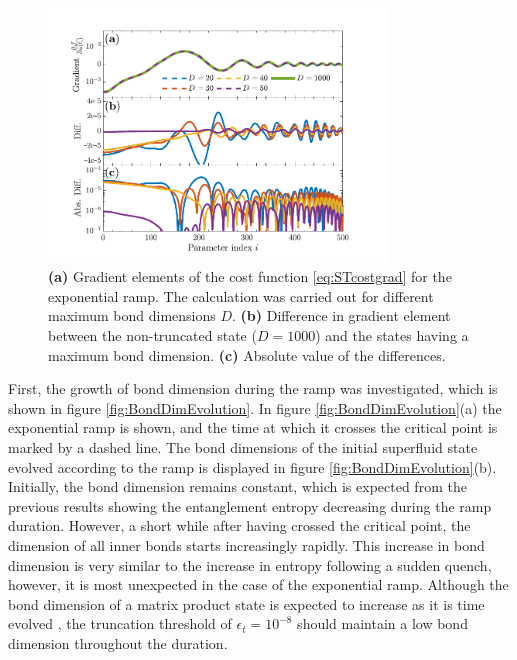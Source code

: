 \begin{figure}[h!]
    \centering
    \includegraphics[width=0.8\textwidth]{Figures/L20/GradientTruncation.pdf}
    \caption{ \textbf{(a)} Gradient elements of the cost function \eqref{eq:STcostgrad} for the exponential ramp. The calculation was carried out for different maximum bond dimensions $D$. \textbf{(b)} Difference in gradient element between the non-truncated state ($D = 1000$) and the states having a maximum bond dimension. \textbf{(c)} Absolute value of the differences. }
    \label{fig:GradientTruncation}
\end{figure}

First, the growth of bond dimension during the ramp was investigated, which is shown in figure \ref{fig:BondDimEvolution}. In figure \ref{fig:BondDimEvolution}(a) the exponential ramp is shown, and the time at which it crosses the critical point is marked by a dashed line. The bond dimensions of the initial superfluid state evolved according to the ramp is displayed in figure \ref{fig:BondDimEvolution}(b). Initially, the bond dimension remains constant, which is expected from the previous results showing the entanglement entropy decreasing during the ramp duration. However, a short while after having crossed the critical point, the dimension of all inner bonds starts increasingly rapidly. This increase in bond dimension is very similar to the increase in entropy following a sudden quench, however, it is most unexpected in the case of the exponential ramp. Although the bond dimension of a matrix product state is expected to increase as it is time evolved \cite{Daley2004}, the truncation threshold of $\epsilon_t = 10^{-8}$ should maintain a low bond dimension throughout the duration.

